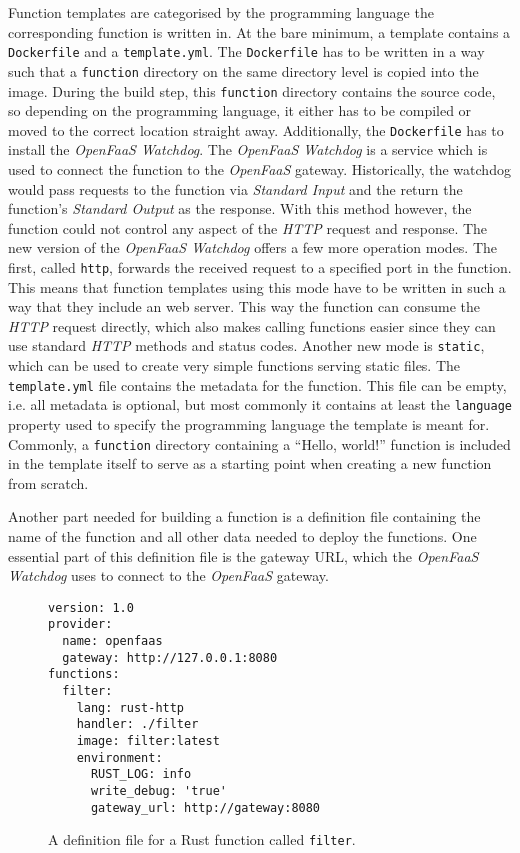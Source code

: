 Function templates are categorised by the programming language the corresponding function is written
in. At the bare minimum, a template contains a \texttt{Dockerfile} and a \texttt{template.yml}. The
\texttt{Dockerfile} has to be written in a way such that a \texttt{function} directory on the same
directory level is copied into the image. During the build step, this \texttt{function} directory
contains the source code, so depending on the programming language, it either has to be compiled or
moved to the correct location straight away. Additionally, the \texttt{Dockerfile} has to install
the \textit{OpenFaaS Watchdog}. The \textit{OpenFaaS Watchdog} is a service which is used to connect
the function to the \textit{OpenFaaS} gateway. Historically, the watchdog would pass requests to the
function via \textit{Standard Input} and the return the function's \textit{Standard Output} as the
response. With this method however, the function could not control any aspect of the \textit{HTTP}
request and response. The new version of the \textit{OpenFaaS Watchdog} offers a few more operation
modes. The first, called \texttt{http}, forwards the received request to a specified port in the
function. This means that function templates using this mode have to be written in such a way that
they include an web server. This way the function can consume the \textit{HTTP} request directly,
which also makes calling functions easier since they can use standard \textit{HTTP} methods and
status codes. Another new mode is \texttt{static}, which can be used to create very simple functions
serving static files. \cite{of-watchdog} The \texttt{template.yml} file contains the metadata for
the function. This file can be empty, i.e. all metadata is optional, but most commonly it contains
at least the \texttt{language} property used to specify the programming language the template is
meant for. \cite{openfaas-build-functions} Commonly, a \texttt{function} directory containing a
“Hello, world!” function is included in the template itself to serve as a starting point when
creating a new function from scratch.

Another part needed for building a function is a definition file containing the name of the function
and all other data needed to deploy the functions. One essential part of this definition file is the
gateway URL, which the \textit{OpenFaaS Watchdog} uses to connect to the \textit{OpenFaaS} gateway.

\begin{figure}[H]
  \centering
  \begin{lstlisting}
version: 1.0
provider:
  name: openfaas
  gateway: http://127.0.0.1:8080
functions:
  filter:
    lang: rust-http
    handler: ./filter
    image: filter:latest
    environment:
      RUST_LOG: info
      write_debug: 'true'
      gateway_url: http://gateway:8080
  \end{lstlisting}
  \caption{A definition file for a Rust function called \texttt{filter}.}
  \label{fig:function-definition}
\end{figure}

